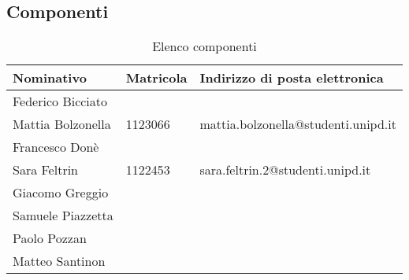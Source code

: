 \subsection{Componenti}
\begin{table}[H]
	\begin{tabular}{|p{4cm}|l|p{6cm}|}
		\hline
		\textbf{Nominativo}& \textbf{Matricola}  & \textbf{Indirizzo di posta elettronica}  \\ \hline
		Federico Bicciato &  &   \\ \hline
		Mattia Bolzonella & 1123066  & mattia.bolzonella@studenti.unipd.it   \\ \hline
		Francesco Donè &  &   \\ \hline
		Sara Feltrin & 1122453 & sara.feltrin.2@studenti.unipd.it   \\ \hline
		Giacomo Greggio &  &   \\ \hline
		Samuele Piazzetta &  &   \\ \hline
		Paolo Pozzan &  &   \\ \hline
		Matteo Santinon&  &   \\ \hline
	\end{tabular}
	\caption{Elenco componenti}
\end{table}
